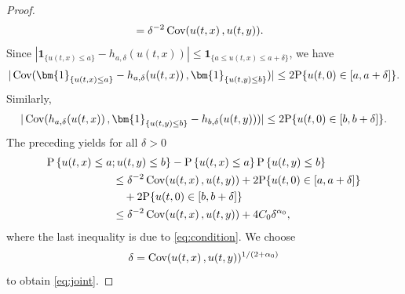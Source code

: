 \documentclass[12pt, reqno]{amsart}
\renewcommand{\P}{\mathrm{P}}
\newcommand{\<}{\langle}
\renewcommand{\>}{\rangle}
\DeclareMathOperator{\Cov}{\text{\rm Cov}}
\begin{document}
\begin{proof}
\begin{align*}
            &=\delta^{-2}\Cov(u(t,x)\,, u(t,y)). 
           \end{align*}
           Since $|\bm{1}_{\{u(t,x)\leq a\}} - h_{a, \delta}(u(t,x))| \leq \bm{1}_{\{a\leq u(t,x)\leq a+\delta\}}$, we have
           \begin{align*}
           |\Cov(\bm{1}_{\{u(t,x)\leq a\}} - h_{a, \delta}(u(t,x))\,, \bm{1}_{\{u(t,y)\leq b\}} )| \leq 2\P\{u(t,0)\in [a, a+\delta]\}.
           \end{align*}
           Similarly, 
           \begin{align*}
           |\Cov(h_{a, \delta}(u(t,x)) \,, \bm{1}_{\{u(t,y)\leq b\}}-h_{b, \delta}(u(t,y)) )| \leq 2\P\{u(t,0)\in [b, b+\delta]\}.
           \end{align*}
           The preceding yields for all $\delta>0$
           \begin{align*}
           &\P\left\{u(t,x) \leq a; u(t,y)\leq b\right\}-  
           \P\left\{u(t,x) \leq a\right\} \P\left\{ u(t,y)\leq b\right\}\\
           &\qquad\qquad\qquad \leq \delta^{-2}\Cov(u(t,x)\,, u(t,y)) + 2\P\{u(t,0)\in [a, a+\delta]\}\\
           &\qquad\qquad\qquad\quad +2\P\{u(t,0)\in [b, b+\delta]\}\\
           &\qquad\qquad\qquad \leq  \delta^{-2}\Cov(u(t,x)\,, u(t,y)) + 4C_0\delta^{\alpha_0},
           \end{align*}
           where the last inequality is due to \eqref{eq:condition}.  We choose
           \begin{align*}
           \delta = \Cov(u(t,x)\,, u(t, y))^{1/(2+\alpha_0)}
           \end{align*}
           to obtain \eqref{eq:joint}.
\end{proof}
\end{document}
